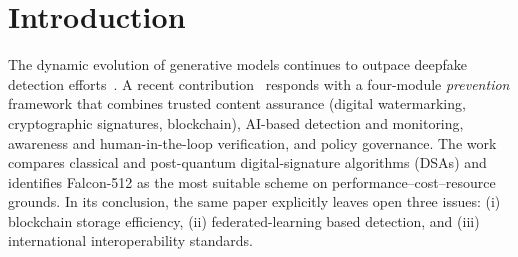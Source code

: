 \documentclass[11pt,a4paper]{article}
\theoremstyle{definition}
\theoremstyle{plain}
\theoremstyle{remark}
\begin{document}
\section{Introduction}\label{sec:intro}

The dynamic evolution of generative models continues to outpace deepfake
detection efforts~\cite{bib1,bib2,bib3}. A recent
contribution~\cite{bib4} responds with a four-module \emph{prevention}
framework that combines trusted content assurance (digital watermarking,
cryptographic signatures, blockchain), AI-based detection and monitoring,
awareness and human-in-the-loop verification, and policy governance. The
work compares classical and post-quantum digital-signature algorithms
(DSAs) and identifies Falcon-512 as the most suitable scheme on
performance--cost--resource grounds. In its conclusion, the same paper
explicitly leaves open three issues: (i) blockchain storage efficiency,
(ii) federated-learning based detection, and (iii) international
interoperability standards.
\end{document}
